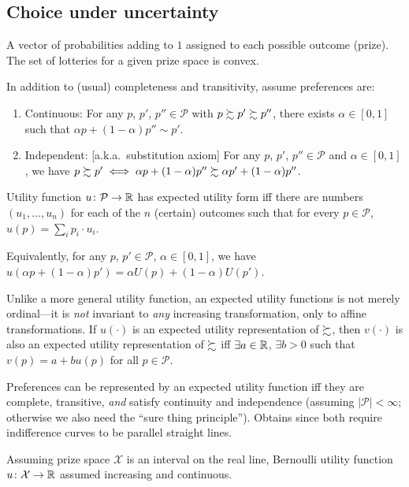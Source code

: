 \documentclass[8pt,letterpaper, landscape]{extarticle} %
\begin{document}
\begin{multicols}{3}
\begin{description}
\subsection{Choice under uncertainty}
 A vector of probabilities adding to $ 1 $ assigned to each possible outcome (prize). The set of lotteries for a given prize space is convex.

 In addition to (usual) completeness and transitivity, assume preferences are:
\begin{enumerate}
\item Continuous: For any $ p $, $ p' $, $ p'' \in \mathcal{P} $ with $ p \succsim p' \succsim p'' $, there exists $ \alpha \in [0,1] $ such that $ \alpha p + (1 - \alpha) p'' \sim p' $.
\item Independent: [a.k.a.\ substitution axiom] For any $ p $, $ p' $, $ p'' \in \mathcal{P} $ and $ \alpha \in [0,1] $, we have $ p \succsim p' \iff \alpha p + (1 - \alpha) p'' \succsim \alpha p' + (1 - \alpha) p'' $.
\end{enumerate}

 Utility function $ u \colon \mathcal{P} \to \mathbb{R} $ has expected utility form iff there are numbers $ (u_1 , \dotsc , u_n) $ for each of the $ n $ (certain) outcomes such that for every $ p \in \mathcal{P} $, $ u(p) = \sum_{i} p_i \cdot u_i $.

Equivalently, for any $ p $, $ p' \in \mathcal{P} $, $ \alpha \in [0,1] $, we have $ u(\alpha p + (1-\alpha) p') = \alpha U(p) + (1 - \alpha) U(p') $.

Unlike a more general utility function, an expected utility functions is not merely ordinal---it is \textit{not} invariant to \textit{any} increasing transformation, only to affine transformations. If $ u (\cdot) $ is an expected utility representation of $ \succsim $, then $ v (\cdot)  $ is also an expected utility representation of $ \succsim $ iff $ \exists a \in \mathbb{R} $, $ \exists b > 0 $ such that $ v(p) = a + bu(p) $ for all $ p \in \mathcal{P} $.

Preferences can be represented by an expected utility function iff they are complete, transitive, \textit{and} satisfy continuity and independence (assuming $ | \mathcal{P} | < \infty $; otherwise we also need the ``sure thing principle''). Obtains since both require indifference curves to be parallel straight lines.

 Assuming prize space $ \mathcal{X} $ is an interval on the real line, Bernoulli utility function $ u \colon \mathcal{X} \to \mathbb{R} $ assumed increasing and continuous.


\end{description}
\end{multicols}
\end{document}
